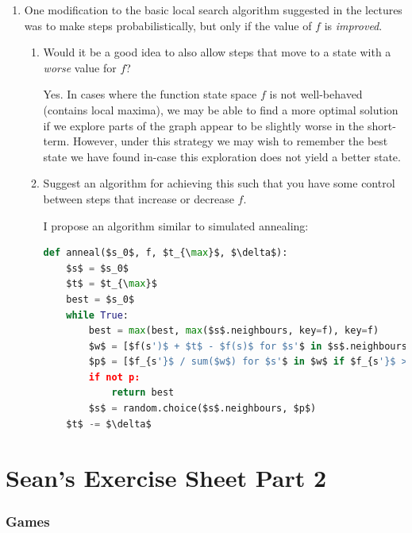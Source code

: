 \documentclass[10pt,\jkfside,a4paper]{article}
\begin{document}
\begin{enumerate}
\item One modification to the basic local search algorithm suggested in the
lectures was to make steps probabilistically, but only if the value of $f$
is \textit{improved}.
\begin{enumerate}[label=(\alph*)]

\item Would it be a good idea to also allow steps that move to a state with
a \textit{worse} value for $f$?

Yes. In cases where the function state space $f$ is not well-behaved
(contains local maxima), we may be able to find a more optimal solution if
we explore parts of the graph appear to be slightly worse in the short-term.
However, under this strategy we may wish to remember the best state we have
found in-case this exploration does not yield a better state.

\item Suggest an algorithm for achieving this such that you have some
control between steps that increase or decrease $f$.

I propose an algorithm similar to simulated annealing:
\begin{lstlisting}[language=Python, mathescape=true]
def anneal($s_0$, f, $t_{\max}$, $\delta$):
    $s$ = $s_0$
    $t$ = $t_{\max}$
    best = $s_0$
    while True:
        best = max(best, max($s$.neighbours, key=f), key=f)
        $w$ = [$f(s')$ + $t$ - $f(s)$ for $s'$ in $s$.neighbours]
        $p$ = [$f_{s'}$ / sum($w$) for $s'$ in $w$ if $f_{s'}$ > 0]
        if not p:
        	return best
        $s$ = random.choice($s$.neighbours, $p$)
	$t$ -= $\delta$
\end{lstlisting}


\end{enumerate}

\end{enumerate}

\part{Sean's Exercise Sheet Part 2}

\setcounter{section}{0}

\section{Games}
\end{document}
